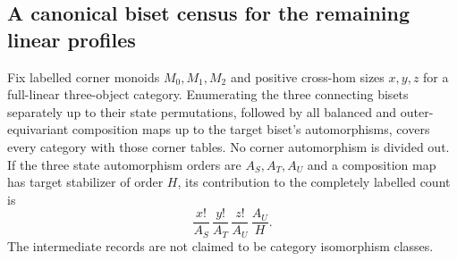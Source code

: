 \subsection{A canonical biset census for the remaining linear profiles}

\begin{proposition}
\label{CP2:A-linear-biset-enumeration}
Fix labelled corner monoids $M_0,M_1,M_2$ and positive
cross-hom sizes $x,y,z$ for a full-linear three-object category.
Enumerating the three connecting bisets separately up to their
state permutations, followed by all balanced and outer-equivariant
composition maps up to the target biset's automorphisms, covers
every category with those corner tables. No corner automorphism
is divided out. If the three state automorphism orders are
$A_S,A_T,A_U$ and a composition map has target stabilizer of
order $H$, its contribution to the completely labelled count is
\[
 \frac{x!}{A_S}\,\frac{y!}{A_T}\,\frac{z!}{A_U}\,
 \frac{A_U}{H}.
\]
The intermediate records are not claimed to be category
isomorphism classes.
\end{proposition}
